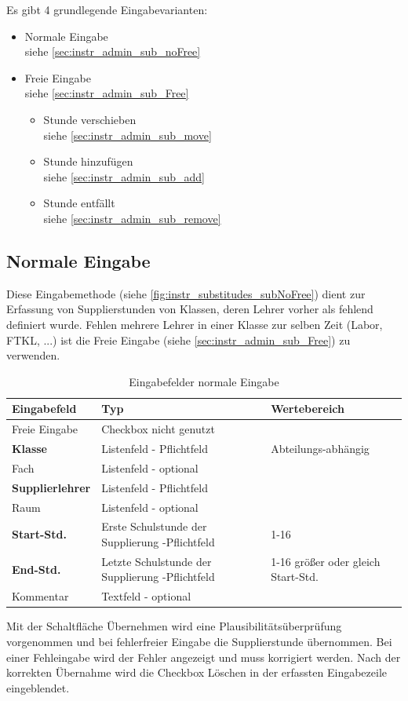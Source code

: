 Es gibt 4 grundlegende Eingabevarianten:
\begin{itemize}
	\item Normale Eingabe\\
		siehe \autoref{sec:instr_admin_sub_noFree}
	\item Freie Eingabe\\
		siehe \autoref{sec:instr_admin_sub_Free}
		\begin{itemize}
			\item Stunde verschieben\\
				siehe \autoref{sec:instr_admin_sub_move}
			\item Stunde hinzufügen\\
				siehe \autoref{sec:instr_admin_sub_add}
			\item Stunde entfällt\\
				siehe \autoref{sec:instr_admin_sub_remove}
		\end{itemize}
\end{itemize}
\subsection{Normale Eingabe}\label{sec:instr_admin_sub_noFree}
Diese Eingabemethode (siehe \autoref{fig:instr_substitudes_subNoFree}) dient zur Erfassung von Supplierstunden von Klassen, deren Lehrer vorher als fehlend definiert wurde. Fehlen mehrere Lehrer in einer Klasse zur selben Zeit (Labor, FTKL, ...) ist die Freie Eingabe (siehe \autoref{sec:instr_admin_sub_Free}) zu verwenden.
\begin{table}[H]
\centering
\begin{tabular}{p{3 cm}p{6 cm}p{5 cm}}
   \toprule
   \textbf{Eingabefeld} & \textbf{Typ} & \textbf{Wertebereich} \\
   \midrule
          Freie Eingabe & Checkbox \newline nicht genutzt & \\
          \hline
          \textbf{Klasse} & Listenfeld - Pflichtfeld & Abteilungs-abhängig \\
          \hline
          Fach & Listenfeld - optional & \\
          \hline
          \textbf{Supplierlehrer} & Listenfeld - Pflichtfeld & \\
          \hline
          Raum & Listenfeld - optional & \\
          \hline
          \textbf{Start-Std.} & Erste Schulstunde der Supplierung  -Pflichtfeld & 1-16 \\
		  \hline
          \textbf{End-Std.} & Letzte Schulstunde der Supplierung  -Pflichtfeld & 1-16 \newline größer oder gleich Start-Std.\\
          \hline
          Kommentar & Textfeld - optional & \\
   \bottomrule
\end{tabular}
\caption{Eingabefelder normale Eingabe}
\end{table}
Mit der Schaltfläche Übernehmen wird eine Plausibilitätsüberprüfung vorgenommen und bei fehlerfreier Eingabe die Supplierstunde übernommen. Bei einer Fehleingabe wird der Fehler angezeigt und muss korrigiert werden. Nach der korrekten Übernahme wird die Checkbox Löschen in der erfassten Eingabezeile eingeblendet.
